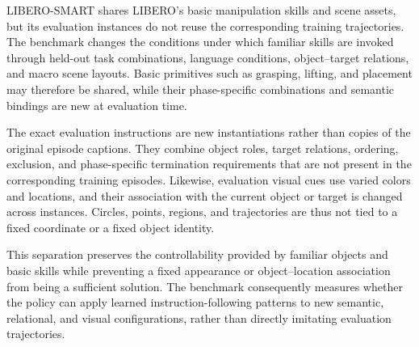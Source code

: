LIBERO-SMART shares LIBERO's basic manipulation skills and scene assets,
but its evaluation instances do not reuse the corresponding training
trajectories. The benchmark changes the conditions under which familiar
skills are invoked through held-out task combinations, language
conditions, object--target relations, and macro scene layouts. Basic
primitives such as grasping, lifting, and placement may therefore be
shared, while their phase-specific combinations and semantic bindings are
new at evaluation time.

The exact evaluation instructions are new instantiations rather than
copies of the original episode captions. They combine object roles,
target relations, ordering, exclusion, and phase-specific termination
requirements that are not present in the corresponding training
episodes. Likewise, evaluation visual cues use varied colors and
locations, and their association with the current object or target is
changed across instances. Circles, points, regions, and trajectories are
thus not tied to a fixed coordinate or a fixed object identity.

This separation preserves the controllability provided by familiar
objects and basic skills while preventing a fixed appearance or
object--location association from being a sufficient solution. The
benchmark consequently measures whether the policy can apply learned
instruction-following patterns to new semantic, relational, and visual
configurations, rather than directly imitating evaluation trajectories.



